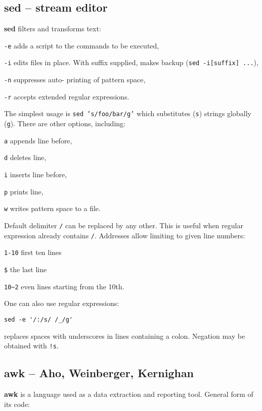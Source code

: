 \subsection{sed -- stream editor}
\begin{compactenum}
	\item [\cmdcore] \textbf{sed} filters and transforms text:
	\item [\texttt{-e}] adds a script to the commands to be executed,
	\item [\texttt{-i}] edits files in place. With suffix supplied, makes backup (\texttt{sed -i[suffix] ...}), 
	\item [\texttt{-n}] suppresses auto- printing of pattern space,
  \item [\texttt{-r}] accepts extended regular expressions.
\end{compactenum}

The simplest usage is \texttt{sed 's/foo/bar/g'}
which substitutes (\texttt{s}) strings globally (\texttt{g}).
There are other options, including:
\begin{compactenum}
\item [\texttt{a}] appends line before,
\item [\texttt{d}] deletes line,
\item [\texttt{i}] inserts line before,
\item [\texttt{p}] prints line,
\item [\texttt{w}] writes pattern space to a file.
\end{compactenum}

Default delimiter \texttt{/} can be replaced by any other.
This is useful when regular expression already contains \texttt{/}.
Addresses allow limiting to given line numbers:
\begin{compactenum}
\item \texttt{1-10} first ten lines
\item \texttt{\$} the last line
\item \texttt{10\textasciitilde 2} even lines starting from the 10th.
\end{compactenum}

One can also use regular expressions:
\begin{verbatim}
sed -e '/:/s/ /_/g'
\end{verbatim}
replaces spaces with underscores in lines containing a colon.
Negation may be obtained with \texttt{!s}.


\subsection{awk -- Aho, Weinberger, Kernighan}
\begin{compactenum}
\item [\cmdvar] \textbf{awk} is a language used as a data extraction and reporting tool.
General form of its code:
\end{compactenum}

